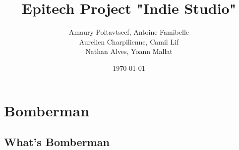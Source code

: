 \documentclass {beamer}                                                                                         %
\begin{document}
\title {Epitech Project "Indie Studio"}                                                            %
\author {Amaury Poltavtseef, Antoine Famibelle\\ Aurelien Charpilienne, Camil Lif\\ Nathan Alves, Yoann Mallat} %
\date {\today}                                                                                                  %
\frame {\titlepage}                                                                                             %
\section {Bomberman}                                                                                   %
\subsection {What's Bomberman}                                                                  %
\end{document}
